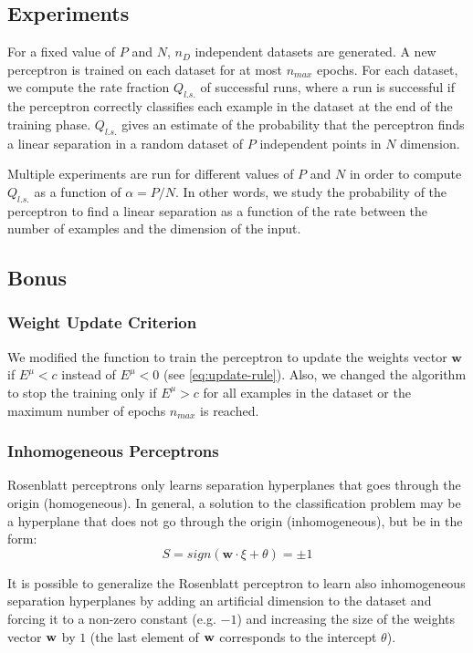 \subsection{Experiments}
For a fixed value of $P$ and $N$, $n_D$ independent datasets are generated.
A new perceptron is trained on each dataset for at most $n_{max}$ epochs.
For each dataset, we compute the rate fraction $Q_{l.s.}$ of successful runs, where a run is successful if the perceptron correctly classifies each example in the dataset at the end of the training phase.
$Q_{l.s.}$ gives an estimate of the probability that the perceptron finds a linear separation in a random dataset of $P$ independent points in $N$ dimension.

Multiple experiments are run for different values of $P$ and $N$ in order to compute $Q_{l.s.}$ as a function of $\alpha = P / N$.
In other words, we study the probability of the perceptron to find a linear separation as a function of the rate between the number of examples and the dimension of the input.

\subsection{Bonus}
\subsubsection{Weight Update Criterion}
We modified the function to train the perceptron to update the weights vector $\mathsf{\bm{w}}$ if $E^\mu < c$ instead of $E^\mu < 0$ (see \cref{eq:update-rule}).
Also, we changed the algorithm to stop the training only if $E^{\mu} > c$ for all examples in the dataset or the maximum number of epochs $n_{max}$ is reached.

\subsubsection{Inhomogeneous Perceptrons}
Rosenblatt perceptrons only learns separation hyperplanes that goes through the origin (homogeneous).
In general, a solution to the classification problem may be a hyperplane that does not go through the origin (inhomogeneous), but be in the form:
\begin{equation}
    S = sign(\mathsf{\bm{w}} \cdot \xi + \theta) = \pm 1
\end{equation}

It is possible to generalize the Rosenblatt perceptron to learn also inhomogeneous separation hyperplanes by adding an artificial dimension to the dataset and forcing it to a non-zero constant (e.g. $-1$) and increasing the size of the weights vector $\mathsf{\bf{w}}$ by $1$ (the last element of $\mathsf{\bf{w}}$ corresponds to the intercept $\theta$).
